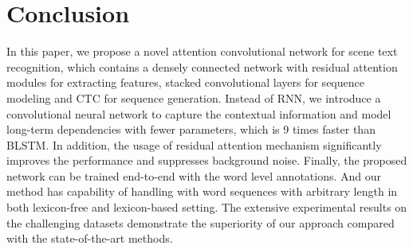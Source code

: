 \documentclass[letterpaper]{article} %
\begin{document}
\section{Conclusion}

In this paper, we propose a novel attention convolutional network for scene text recognition, which contains a densely connected network with residual attention modules for extracting features, stacked convolutional layers for sequence modeling and CTC for sequence generation. Instead of RNN, we introduce a convolutional neural network to capture the contextual information and model long-term dependencies with fewer parameters, which is 9 times faster than BLSTM. In addition, the usage of residual attention mechanism significantly improves the performance and suppresses background noise. Finally, the proposed network can be trained end-to-end with the word level annotations. And our method has capability of handling with word sequences with arbitrary length in both lexicon-free and lexicon-based setting. The extensive experimental results on the challenging datasets demonstrate the superiority of our approach compared with the state-of-the-art methods.





\end{document}
